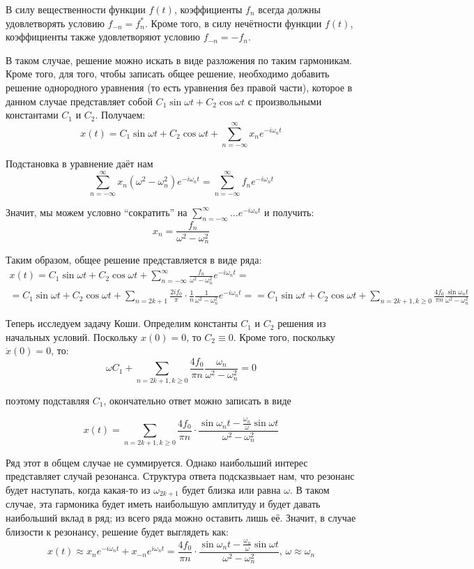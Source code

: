 \documentclass[a4paper,12pt]{article}
\begin{document}
\noindent
В силу вещественности функции $f\left(t\right)$, коэффициенты $f_{n}$
всегда должны удовлетворять условию $f_{-n}=f_{n}^{*}$. Кроме того,
в силу нечётности функции $f\left(t\right)$, коэффициенты также удовлетворяют
условию $f_{-n}=-f_{n}$.

\noindent
В таком случае, решение можно искать в виде разложения по таким гармоникам.
Кроме того, для того, чтобы записать общее решение, необходимо добавить
решение однородного уравнения (то есть уравнения без правой части),
которое в данном случае представляет собой $C_{1}\sin\omega t+C_{2}\cos\omega t$
с произвольными константами $C_{1}$ и $C_{2}$. Получаем:
\[
x(t)=C_{1}\sin\omega t+C_{2}\cos\omega t+\sum_{n=-\infty}^{\infty}x_{n}e^{-i\omega_{n}t}
\]


\noindent
Подстановка в уравнение даёт нам
\[
\sum_{n=-\infty}^{\infty}x_{n}\left(\omega^{2}-\omega_{n}^{2}\right)e^{-i\omega_{n}t}=\sum_{n=-\infty}^{\infty}f_{n}e^{-i\omega_{n}t}
\]


\noindent
Значит, мы можем условно ``сократить'' на $\sum_{n=-\infty}^{\infty}\dots e^{-i\omega_{n}t}$
и получить:
\[
x_{n}=\frac{f_{n}}{\omega^{2}-\omega_{n}^{2}}
\]


\noindent
Таким образом, общее решение представляется в виде ряда:
\begin{multline*}
x(t)=C_{1}\sin\omega t+C_{2}\cos\omega t+\sum_{n=-\infty}^{\infty}\frac{f_{n}}{\omega^{2}-\omega_{n}^{2}}e^{-i\omega_{n}t}=\\
=C_{1}\sin\omega t+C_{2}\cos\omega t+\sum_{n=2k+1}\frac{2if_{0}}{\pi}\cdot\frac{1}{n}\frac{1}{\omega^{2}-\omega_{n}^{2}}e^{-i\omega_{n}t}=
=C_{1}\sin\omega t+C_{2}\cos\omega t+\sum_{n=2k+1,k\geq0}\frac{4f_{0}}{\pi n}\frac{\sin\omega_{n}t}{\omega^{2}-\omega_{n}^{2}}
\end{multline*}


\noindent
Теперь исследуем задачу Коши. Определим константы $C_{1}$ и $C_{2}$
решения из начальных условий. Поскольку $x\left(0\right)=0$, то $C_{2}\equiv0$.
Кроме того, поскольку $\dot{x}\left(0\right)=0$, то:
\[
\omega C_{1}+\sum_{n=2k+1,k\geq0}\frac{4f_{0}}{\pi n}\frac{\omega_{n}}{\omega^{2}-\omega_{n}^{2}}=0
\]


\noindent
поэтому подставляя $C_{1}$, окончательно ответ можно записать в виде

\[
x(t)=\sum_{n=2k+1,k\geq0}\frac{4f_{0}}{\pi n}\cdot\frac{\sin\omega_{n}t-\frac{\omega_{n}}{\omega}\sin\omega t}{\omega^{2}-\omega_{n}^{2}}
\]


\noindent
Ряд этот в общем случае не суммируется. Однако наибольший интерес
представляет случай резонанса. Структура ответа подсказвыает нам,
что резонанс будет наступать, когда какая-то из $\omega_{2k+1}$ будет
близка или равна $\omega$. В таком случае, эта гармоника будет иметь
наибольшую амплитуду и будет давать наибольший вклад в ряд; из всего
ряда можно оставить лишь её. Значит, в случае близости к резонансу,
решение будет выглядеть как:
\[
x(t)\approx x_{n}e^{-i\omega_{n}t}+x_{-n}e^{i\omega_{n}t}=\frac{4f_{0}}{\pi n}\cdot\frac{\sin\omega_{n}t-\frac{\omega_{n}}{\omega}\sin\omega t}{\omega^{2}-\omega_{n}^{2}},\,\omega\approx\omega_{n}
\]
\end{document}
